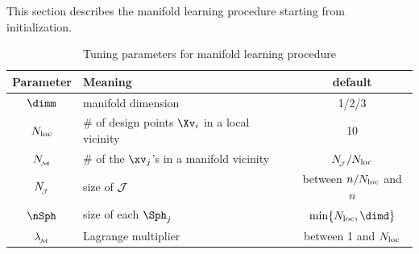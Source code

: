 \label{SEDRmanproc}
This section describes the manifold learning procedure starting from initialization.



\begin{table}[b]
\begin{tabular}{c|l|c}
        \hline
        Parameter & Meaning & default \\
        \hline
        \( \dimm \) & manifold dimension & 1/2/3 \\
        \( N_{\operatorname{loc}} \) & \( \# \) of design points \( \Xv_{i} \) in a local vicinity & 10 \\
		\( N_{_{\! \mathcal{M}}} \) & \( \# \) of the \( \xv_{j} \)'s in a manifold vicinity & \( N_{\!_{\mathcal{J}}}/N_{\operatorname{loc}} \) \\
        \( N_{\!_{\mathcal{J}}} \) & size of \( \mathcal{J} \) 				& between \( n/N_{\operatorname{loc}} \) and \( n \) \\
		\( \nSph \) & size of each \( \Sph_{j} \)		& \( \min\{ \nmin, \dimd \} \) \\
		\( \lambda_{{_{\! \mathcal{M}}}} \) & Lagrange multiplier 		& between 1 and \( N_{\operatorname{loc}} \) \\
		\hline
    \end{tabular}
\caption{Tuning parameters for manifold learning procedure}    
\label{TdefML}
\end{table}


